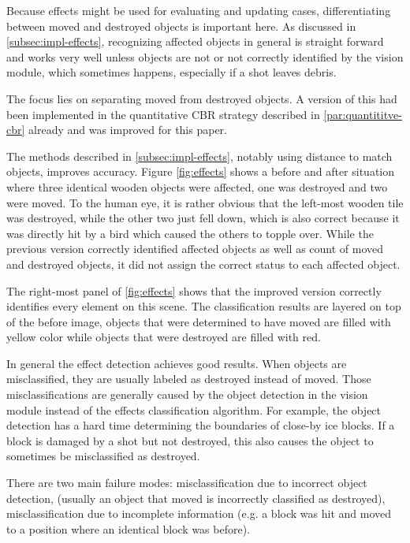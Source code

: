 Because effects might be used for evaluating and updating cases, differentiating between moved and destroyed objects is important here.
As discussed in \ref{subsec:impl-effects}, recognizing affected objects in general is straight forward and works very well unless objects are not or not correctly identified by the vision module, which sometimes happens, especially if a shot leaves debris.

The focus lies on separating moved from destroyed objects.
A version of this had been implemented in the quantitative \ac{CBR} strategy described in \ref{par:quantititve-cbr} already and was improved for this paper.

The methods described in \ref{subsec:impl-effects}, notably using distance to match objects, improves accuracy. Figure \ref{fig:effects} shows a before and after situation where three identical wooden objects were affected, one was destroyed and two were moved.
To the human eye, it is rather obvious that the left-most wooden tile was destroyed, while the other two just fell down, which is also correct because it was directly hit by a bird which caused the others to topple over.
While the previous version correctly identified affected objects as well as count of moved and destroyed objects, it did not assign the correct status to each affected object.

The right-most panel of \ref{fig:effects} shows that the improved version correctly identifies every element on this scene.
The classification results are layered on top of the before image, objects that were determined to have moved are filled with yellow color while objects that were destroyed are filled with red.

In general the effect detection achieves good results. When objects are misclassified, they are usually labeled as destroyed instead of moved. Those misclassifications are generally caused by the object detection in the vision module instead of the effects classification algorithm.
For example, the object detection has a hard time determining the boundaries of close-by ice blocks. If a block is damaged by a shot but not destroyed, this also causes the object to sometimes be misclassified as destroyed.

There are two main failure modes: misclassification due to incorrect object detection, (usually an object that moved is incorrectly classified as destroyed), misclassification due to incomplete information (e.g. a block was hit and moved to a position where an identical block was before).

